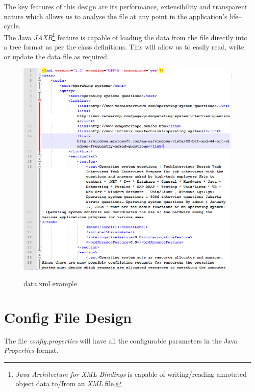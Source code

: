 \documentclass[a4paper,10pt]{report}
\begin{document}
\noindent The key features of this design are its performance, extensibility and transparent nature which allows us to analyse the file at any point in the application's life--cycle. \\

\noindent The Java \emph{JAXB}\footnote{\emph{Java Architecture for XML Bindings} is capable of writing/reading annotated object data to/from an \emph{XML} file.} feature is capable of loading the data from the file directly into a tree format as per the class definitions. This will allow us to easily read, write or update the data file as required.

\begin{figure}[h!]
\centering
\includegraphics[width=\textwidth]{./diagrams/xml}\\
\caption{data.xml example}
\end{figure}

\clearpage


\chapter{Config File Design}

The file \emph{config.properties} will have all the configurable parameters in the Java \emph{Properties} format. \\
\end{document}
